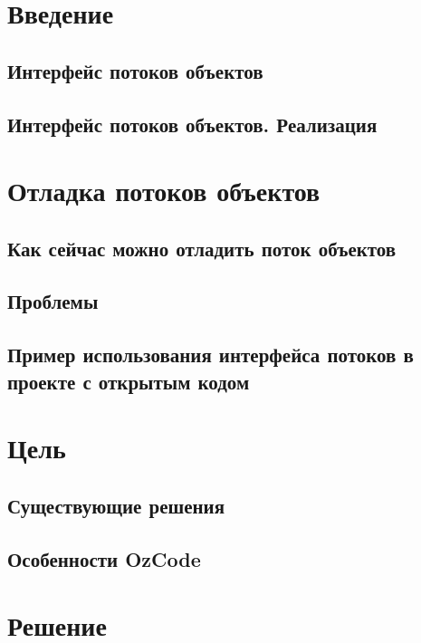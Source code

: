 

\section{Введение}

\subsection{Интерфейс потоков объектов}

\subsection{Интерфейс потоков объектов. Реализация}





\section{Отладка потоков объектов}
\subsection{Как сейчас можно отладить поток объектов}

\subsection{Проблемы}

\subsection{Пример использования интерфейса потоков в проекте с открытым кодом}


\section{Цель}

\subsection{Существующие решения}

\subsection{Особенности OzCode}


\section{Решение}
